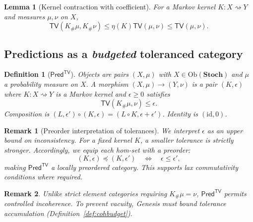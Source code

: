 \documentclass[11pt,a4paper]{article}
\newtheorem{lemma}[theorem]{Lemma}
\newtheorem{definition}{Definition}[section]
\newtheorem{remark}{Remark}[section]
\newcommand{\Stoch}{\mathbf{Stoch}}
\newcommand{\TV}{\mathsf{TV}}
\begin{document}
\begin{lemma}[Kernel contraction with coefficient]
For a Markov kernel $K:X\rightsquigarrow Y$ and measures $\mu,\nu$ on $X$,
\[
\TV(K_\#\mu,K_\#\nu)\le \eta(K)\TV(\mu,\nu)\le \TV(\mu,\nu).
\]
\end{lemma}

\subsection{Predictions as a \emph{budgeted} toleranced category}
\begin{definition}[$\mathsf{Pred}^{\TV}$]
Objects are pairs $(X,\mu)$ with $X\in\mathrm{Ob}(\Stoch)$ and $\mu$ a probability measure on $X$.
A morphism $(X,\mu)\to(Y,\nu)$ is a pair $(K,\epsilon)$ where $K:X\rightsquigarrow Y$ is a Markov kernel and $\epsilon\ge 0$ satisfies
\[
\TV(K_\#\mu,\nu)\le \epsilon.
\]
Composition is $(L,\epsilon')\circ(K,\epsilon)=(L\circ K,\epsilon+\epsilon')$.
Identity is $(\mathrm{id},0)$.
\end{definition}


\begin{remark}[Preorder interpretation of tolerances]
We interpret $\epsilon$ as an \emph{upper bound} on inconsistency.
For a fixed kernel $K$, a smaller tolerance is strictly stronger.
Accordingly, we equip each hom-set with a preorder:
\[
(K,\epsilon)\preceq (K,\epsilon')\quad \Longleftrightarrow\quad \epsilon\le \epsilon',
\]
making $\mathsf{Pred}^{\TV}$ a \emph{locally preordered} category.
This supports \emph{lax} commutativity conditions where required.
\end{remark}

\begin{remark}
Unlike strict element categories requiring $K_\#\mu=\nu$, $\mathsf{Pred}^{\TV}$ permits controlled incoherence.
To prevent vacuity, Genesis must bound tolerance accumulation (Definition~\ref{def:cohbudget}).
\end{remark}
\end{document}
